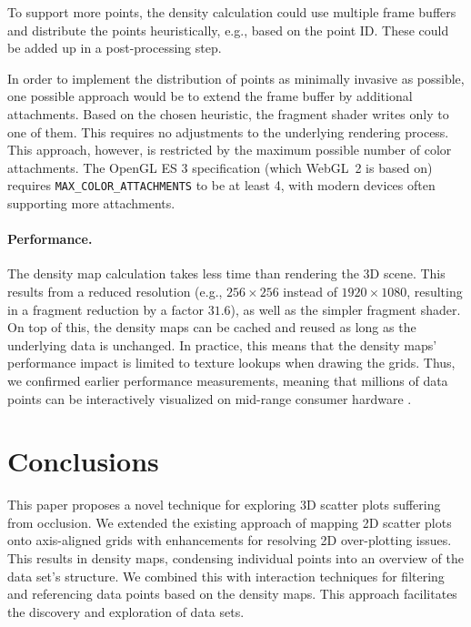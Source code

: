 \documentclass[sigconf]{acmart}
\begin{document}
To support more points, the density calculation could
use multiple frame buffers and distribute the points heuristically, e.g., based on the point ID.
These could be added up in a post-processing step.

In order to implement the distribution of points as minimally invasive as possible, one possible approach would be to extend the frame buffer by additional attachments. Based on the chosen heuristic, the fragment shader writes only to one of them. This requires no adjustments to the underlying rendering process. This approach, however, is restricted by the maximum possible number of color attachments. The OpenGL ES 3 specification (which WebGL~2 is based on) requires \texttt{MAX\_COLOR\_ATTACHMENTS} to be at least 4, with modern devices often supporting more attachments.%

\paragraph{Performance.}
The density map calculation takes less time than rendering the 3D scene.
This results from a reduced resolution (e.g., $256\times256$ instead of $1920\times1080$, resulting in a fragment reduction by a factor $31.6$), as well as the simpler fragment shader. 
On top of this, the density maps can be cached and reused as long as the underlying data is unchanged.
In practice, this means that the density maps' performance impact is limited to texture lookups when drawing the grids.
Thus, we confirmed earlier performance measurements, meaning that millions of data points can be interactively visualized on mid-range consumer hardware \cite{scatterplot}.

\section{Conclusions}
\label{sec:conclusion}

This paper proposes a novel technique for exploring 3D scatter plots suffering from occlusion.
We extended the existing approach of mapping 2D scatter plots onto axis-aligned grids with enhancements for resolving 2D over-plotting issues.
This results in density maps, condensing individual points into an overview of the data set's structure.
We combined this with interaction techniques for filtering and referencing data points based on the density maps.
This approach facilitates the discovery and exploration of data sets.
\end{document}
